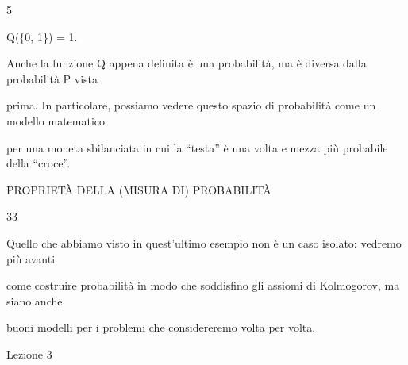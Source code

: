 \documentclass[a4paper,portrait,12pt]{article}
\begin{document}
5





\begin{flushleft}
Q(\{0, 1\}) = 1.
\end{flushleft}





\begin{flushleft}
Anche la funzione Q appena definita \`{e} una probabilit\`{a}, ma \`{e} diversa dalla probabilit\`{a} P vista
\end{flushleft}


\begin{flushleft}
prima. In particolare, possiamo vedere questo spazio di probabilit\`{a} come un modello matematico
\end{flushleft}


\begin{flushleft}
per una moneta sbilanciata in cui la ``testa'' \`{e} una volta e mezza più probabile della ``croce''.
\end{flushleft}





\begin{flushleft}
 PROPRIET\`{A} DELLA (MISURA DI) PROBABILIT\`{A}
\end{flushleft}





33





\begin{flushleft}
Quello che abbiamo visto in quest'ultimo esempio non \`{e} un caso isolato: vedremo più avanti
\end{flushleft}


\begin{flushleft}
come costruire probabilit\`{a} in modo che soddisfino gli assiomi di Kolmogorov, ma siano anche
\end{flushleft}


\begin{flushleft}
buoni modelli per i problemi che considereremo volta per volta.
\end{flushleft}


\begin{flushleft}
Lezione 3
\end{flushleft}
\end{document}
